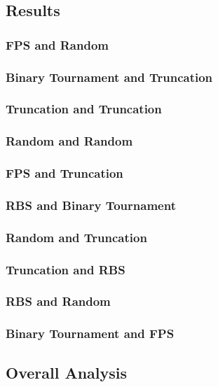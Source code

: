 \documentclass[11pt, letterpaper]{article}
\begin{document}
\subsection {Results} 
\subsubsection {FPS and Random}
\subsubsection {Binary Tournament and Truncation}
\subsubsection {Truncation and Truncation}
\subsubsection {Random and Random}
\subsubsection {FPS and Truncation}
\subsubsection {RBS and Binary Tournament}
\subsubsection {Random and Truncation}
\subsubsection {Truncation and RBS}
\subsubsection {RBS and Random}
\subsubsection {Binary Tournament and FPS}
\subsection {Overall Analysis}
\end{document}

